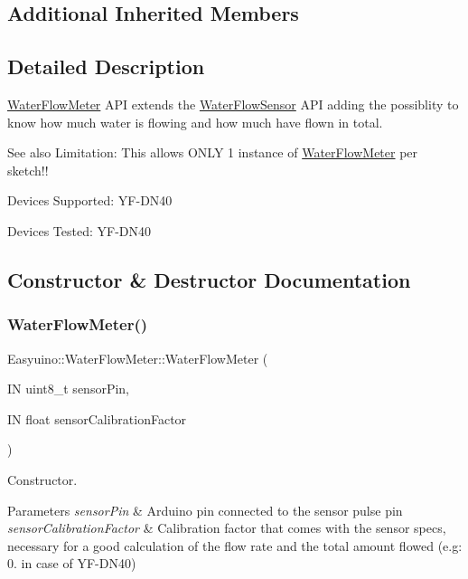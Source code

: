 \subsection*{Additional Inherited Members}


\subsection{Detailed Description}
\hyperlink{class_easyuino_1_1_water_flow_meter}{Water\+Flow\+Meter} A\+PI extends the \hyperlink{class_easyuino_1_1_water_flow_sensor}{Water\+Flow\+Sensor} A\+PI adding the possiblity to know how much water is flowing and how much have flown in total. 

\begin{DoxySeeAlso}{See also}
Limitation\+: This allows O\+N\+LY 1 instance of \hyperlink{class_easyuino_1_1_water_flow_meter}{Water\+Flow\+Meter} per sketch!! 

Devices Supported\+: Y\+F-\/\+D\+N40 

Devices Tested\+: Y\+F-\/\+D\+N40 
\end{DoxySeeAlso}


\subsection{Constructor \& Destructor Documentation}
\mbox{\label{class_easyuino_1_1_water_flow_meter_a51374e5ffa6327028f4d5fe730083672}} 
\subsubsection{\texorpdfstring{Water\+Flow\+Meter()}{WaterFlowMeter()}}
{\footnotesize\ttfamily Easyuino\+::\+Water\+Flow\+Meter\+::\+Water\+Flow\+Meter (\begin{DoxyParamCaption}\item[{IN uint8\+\_\+t}]{sensor\+Pin,  }\item[{IN float}]{sensor\+Calibration\+Factor }\end{DoxyParamCaption})}



Constructor. 


\begin{DoxyParams}{Parameters}
{\em sensor\+Pin} & Arduino pin connected to the sensor pulse pin \\
\hline
{\em sensor\+Calibration\+Factor} & Calibration factor that comes with the sensor specs, necessary for a good calculation of the flow rate and the total amount flowed (e.\+g\+: 0. in case of Y\+F-\/\+D\+N40) \\
\hline
\end{DoxyParams}


